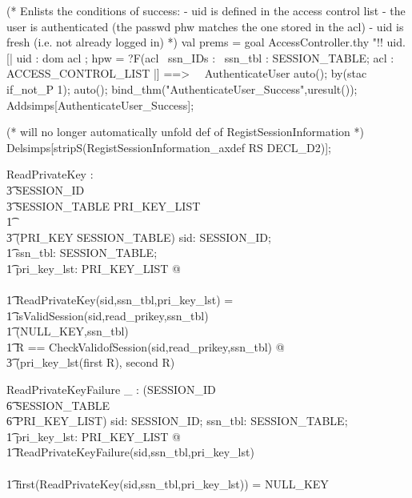 \documentclass[a4paper,pdftex]{article}
\newenvironment{holz-proof}{\comment}{\endcomment}
\begin{document}
\begin{holz-proof}
(* Enlists the conditions of success:
   - uid is defined in the access control list
   - the user is authenticated (the passwd phw matches the one
     stored in the acl)
   - uid is fresh (i.e. not already logged in) 
 *)
val prems = goal AccessController.thy 
"!! uid. [| uid : dom acl ; hpw = ?F(acl%
\           ssn_IDs : %
\           ssn_tbl : SESSION_TABLE; acl : ACCESS_CONTROL_LIST |] ==>   \
\ AuthenticateUser %
auto();
by(stac if_not_P 1); 
auto();
bind_thm("AuthenticateUser_Success",uresult());
Addsimps[AuthenticateUser_Success];

(* will no longer automatically unfold def of RegistSessionInformation *)
Delsimps[stripS(RegistSessionInformation_axdef RS DECL_D2)];


\end{holz-proof}


\begin{axdef}
ReadPrivateKey : \\
\t3 SESSION\_ID \cross \\
\t3 SESSION\_TABLE \cross PRI\_KEY\_LIST \\
\t1 \fun \\ 
\t3 (PRI\_KEY \cross SESSION\_TABLE)
\where
\forall sid: SESSION\_ID; \\
\t1 ssn\_tbl: SESSION\_TABLE; \\
\t1 pri\_key\_lst: PRI\_KEY\_LIST @ \\
\\
\t1 ReadPrivateKey(sid,ssn\_tbl,pri\_key\_lst) = \\
\t1 \IF \lnot isValidSession(sid,read\_prikey,ssn\_tbl) \\
\t1 \THEN (NULL\_KEY,ssn\_tbl) \\
\t1 \ELSE \LET R == CheckValidofSession(sid,read\_prikey,ssn\_tbl) @ \\
\t3        (pri\_key\_lst(first R), second R)
\end{axdef}

\begin{holz-proof}

\end{holz-proof}


\begin{axdef}
ReadPrivateKeyFailure \_ : \power (SESSION\_ID \cross \\
\t6                                     SESSION\_TABLE \cross \\
\t6                                     PRI\_KEY\_LIST)
\where
\forall sid: SESSION\_ID; ssn\_tbl: SESSION\_TABLE; \\
\t1 pri\_key\_lst: PRI\_KEY\_LIST @ \\
\t1 ReadPrivateKeyFailure(sid,ssn\_tbl,pri\_key\_lst)\\
 \iff \\
\t1 first(ReadPrivateKey(sid,ssn\_tbl,pri\_key\_lst)) = NULL\_KEY
\end{axdef}
\end{document}
